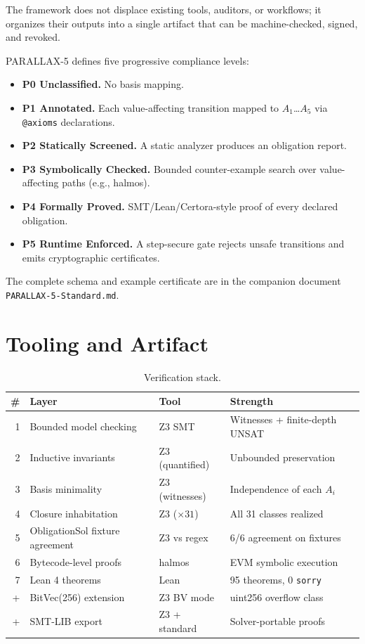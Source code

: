 \documentclass[11pt,a4paper]{article}
\begin{document}
The framework does not displace existing tools, auditors, or workflows; it organizes their outputs into a single artifact that can be machine-checked, signed, and revoked.

PARALLAX-5 defines five progressive compliance levels:
\begin{itemize}
  \item \textbf{P0 Unclassified.} No basis mapping.
  \item \textbf{P1 Annotated.} Each value-affecting transition mapped to $A_1$\ldots$A_5$ via \verb|@axioms| declarations.
  \item \textbf{P2 Statically Screened.} A static analyzer produces an obligation report.
  \item \textbf{P3 Symbolically Checked.} Bounded counter-example search over value-affecting paths (e.g., halmos).
  \item \textbf{P4 Formally Proved.} SMT/Lean/Certora-style proof of every declared obligation.
  \item \textbf{P5 Runtime Enforced.} A step-secure gate rejects unsafe transitions and emits cryptographic certificates.
\end{itemize}
The complete schema and example certificate are in the companion document \texttt{PARALLAX-5-Standard.md}.

\section{Tooling and Artifact}\label{sec:stack}

\begin{table}[t]
\centering
\small
\begin{tabular}{rlll}
\toprule
\# & Layer & Tool & Strength \\
\midrule
1 & Bounded model checking & Z3 SMT & Witnesses + finite-depth UNSAT \\
2 & Inductive invariants & Z3 (quantified) & Unbounded preservation \\
3 & Basis minimality & Z3 (witnesses) & Independence of each $A_i$ \\
4 & Closure inhabitation & Z3 ($\times 31$) & All 31 classes realized \\
5 & ObligationSol fixture agreement & Z3 vs regex & 6/6 agreement on fixtures \\
6 & Bytecode-level proofs & halmos & EVM symbolic execution \\
7 & Lean 4 theorems & Lean & 95 theorems, 0 \texttt{sorry} \\
+ & BitVec(256) extension & Z3 BV mode & uint256 overflow class \\
+ & SMT-LIB export & Z3 + standard & Solver-portable proofs \\
\bottomrule
\end{tabular}
\caption{Verification stack.}\label{tab:stack}
\end{table}
\end{document}
